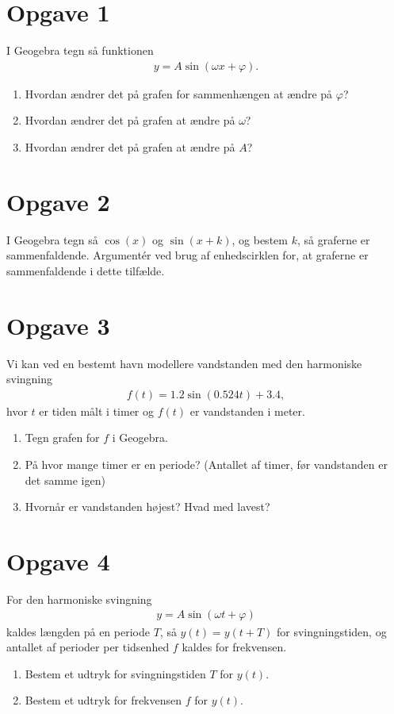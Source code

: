 \section*{Opgave 1}
I Geogebra tegn så funktionen 
\begin{align*}
y = A\sin(\omega x + \varphi).
\end{align*}
\begin{enumerate}[label=\roman*)]
\item Hvordan ændrer det på grafen for sammenhængen at ændre på $\varphi$?
\item Hvordan ændrer det på grafen at ændre på $\omega$?
\item Hvordan ændrer det på grafen at ændre på $A$?
\end{enumerate}

\section*{Opgave 2}
I Geogebra tegn så $\cos(x)$ og $\sin(x+k)$, og bestem $k$, så graferne er sammenfaldende. Argumentér ved brug af enhedscirklen for, at graferne er sammenfaldende i dette tilfælde. 

\section*{Opgave 3}
Vi kan ved en bestemt havn modellere vandstanden med den harmoniske svingning
\begin{align*}
f(t) = 1.2\sin(0.524t) + 3.4,
\end{align*}
hvor $t$ er tiden målt i timer og $f(t)$ er vandstanden i meter. 
\begin{enumerate}[label=\roman*)]
\item Tegn grafen for $f$ i Geogebra. 
\item På hvor mange timer er en periode? (Antallet af timer, før vandstanden er det samme igen)
\item Hvornår er vandstanden højest? Hvad med lavest?
\end{enumerate}
\section*{Opgave 4}
For den harmoniske svingning 
\begin{align*}
y = A\sin(\omega t + \varphi)
\end{align*}
kaldes længden på en periode $T$, så $y(t) = y(t+T)$ for svingningstiden, og antallet af perioder per tidsenhed $f$ kaldes for frekvensen. 
\begin{enumerate}[label=\roman*)]
\item Bestem et udtryk for svingningstiden $T$ for $y(t)$.
\item Bestem et udtryk for frekvensen $f$ for $y(t)$.
\end{enumerate}

